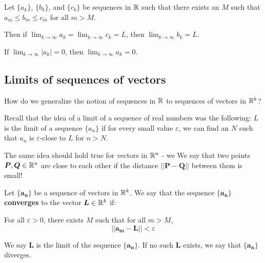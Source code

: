     
    
    

\begin{theorem}
    Let $\{a_k\}$, $\{b_k\}$, and $\{c_k\}$ be sequences in $\mathbb{R}$ such that there exists an $M$ such that $a_m \leq b_m \leq c_m$ for all $m > M$.  
    
    Then if $\lim_{k \to \infty}a_k = \lim_{k \to \infty}c_k = L$, then $\lim_{k \to \infty}b_k = L$.
    
\end{theorem}    
    
\begin{corollary}
    If $\lim_{k \to \infty} |a_k| = 0$, then $\lim_{k \to \infty}a_k = 0$.
\end{corollary}
    
    
    
    
    



\subsection{Limits of sequences of vectors}\label{limseq}

\begin{motivating}
How do we generalize the notion of sequences in $\mathbb{R}$ to sequences of vectors in $\mathbb{R}^k$?
\end{motivating}


Recall that the idea of a limit of a sequence of real numbers was the following:  $L$ is the limit of a sequence $\{a_n\}$ if for every small value $\varepsilon$, we can find an $N$ such that $a_n$ is $\varepsilon$-close to $L$ for $n > N$. 

The same idea should hold true for vectors in $\mathbb{R}^n$ - we We say that two points $\bm{P}, \bm{Q} \in \mathbb{R}^n$ are close to each other if the distance $||\bm{P-Q}||$ between them is small!


    \begin{definition}
    Let $\{\bm{a_n}\}$ be a sequence of vectors in $\mathbb{R}^k$.  We say that the sequence $\{\bm{a_n}\}$ \textbf{converges} to the vector $\bm{L} \in \mathbb{R}^k$ if:
    
    \vspace{1em}
    For all $\varepsilon>0$, there exists $M$ such that for all $m > M$, $$||\bm{a_m} - \bm{L} || < \varepsilon$$
    
    We say $\bm{L}$ is the limit of the sequence $\{\bm{a_n}\}$. If no such $\bm{L}$ exists, we say that $\{\bm{a_n}\}$ diverges.
\end{definition}

